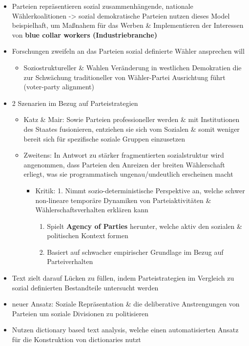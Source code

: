 \documentclass[11pt]{article}
\begin{document}
\begin{itemize}
\item Parteien repräsentieren sozial zusammenhängende, nationale Wählerkoalitionen -> sozial demokratische Parteien nutzen dieses Model beispielhaft, um Maßnahem für das Werben \& Implementieren der Interessen von \textbf{blue collar workers (Industriebranche)}
\item Forschungen zweifeln an das Parteien sozial definierte Wähler ansprechen will 
\begin{itemize}
\item Soziostruktureller \& Wahlen Veränderung in westlichen Demokratien die zur Schwächung traditioneller von Wähler-Partei Ausrichtung führt (voter-party alignment)
\end{itemize}
\item 2 Szenarien im Bezug auf Parteistrategien 
\begin{itemize}
\item Katz \& Mair: Sowie Parteien professioneller werden \& mit Institutionen des Staates fusionieren, entziehen sie sich vom Sozialen \& somit weniger bereit sich für spezifische soziale Gruppen einzusetzen
\item Zweitens: In Antwort zu stärker fragmentierten sozialstruktur wird angenommen, dass Parteien den Anreizen der breiten Wählerschaft erliegt, was sie programmatisch ungenau/undeutlich erscheinen macht 
\begin{itemize}
\item Kritik: 	1. Nimmt sozio-deterministische Perspektive an, welche schwer non-lineare temporäre Dynamiken von Parteiaktivitäten \& Wählerschaftsverhalten erklären kann 
\begin{enumerate}
\item Spielt \textbf{Agency of Parties} herunter, welche aktiv den sozialen \& politischen Kontext formen
\item Basiert auf schwacher empirischer Grundlage im Bezug auf Parteiverhalten
\end{enumerate}
\end{itemize}
\end{itemize}
\item Text zielt darauf Lücken zu füllen, indem Parteistrategien im Vergleich zu sozial definierten Bestandteile untersucht werden
\item neuer Ansatz: Soziale Repräsentation \& die deliberative Anstrengungen von Parteien um soziale Divisionen zu politisieren
\item Nutzen dictionary based text analysis, welche einen automatisierten Ansatz für die Konstruktion von dictionaries nutzt 

\end{itemize}
\end{document}
